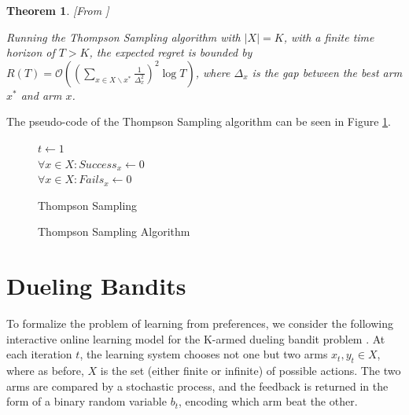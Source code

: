 \documentclass[MSc,beforeExam]{iitcsthesis}
\newtheorem{theorem}{Theorem}
\begin{document}
	\begin{theorem}\label{thm:TS}[From \cite{agrawal2011analysis}]

		Running the Thompson Sampling algorithm with $|X|=K$, with a finite time horizon of $ T > K$, the expected regret is bounded by $R(T) = \mathcal{O} \left( \left(\sum_{x\in X \backslash x^*} \frac{1}{\Delta_x^2} \right)^2 \log T \right)$, where $\Delta_x$ is the gap between the best arm $x^*$ and arm $x$.

	\end{theorem}
	The pseudo-code of the Thompson Sampling algorithm can be seen in Figure \ref{algo_TS}.
	
	\begin{figure}[h]
	\IncMargin{1em}
		\begin{algorithm}[H]
		
			$ t\leftarrow 1$\\
			$\forall x \in X : Success_{x} \leftarrow 0$\\
			$\forall x \in X : Fails_{x} \leftarrow 0$\\			
			\BlankLine
			
			\caption{Thompson Sampling}
		\end{algorithm}
		\caption{Thompson Sampling Algorithm}\label{algo_TS}
	\end{figure}	
\newpage	
	\section{Dueling Bandits}
		To formalize the problem of learning from preferences, we consider the following interactive online learning model for the K-armed dueling bandit problem \cite{yue2012k, yue2009interactively}.
		At each iteration $t$, the learning system chooses not one but two arms $x_t, y_t \in X$, where as before,
 $X$ is the set (either finite or infinite) of possible actions. The two arms are compared 
by a stochastic process,
and the feedback is returned in the form of a binary random variable $b_t$, encoding which arm beat the other.
\end{document}
